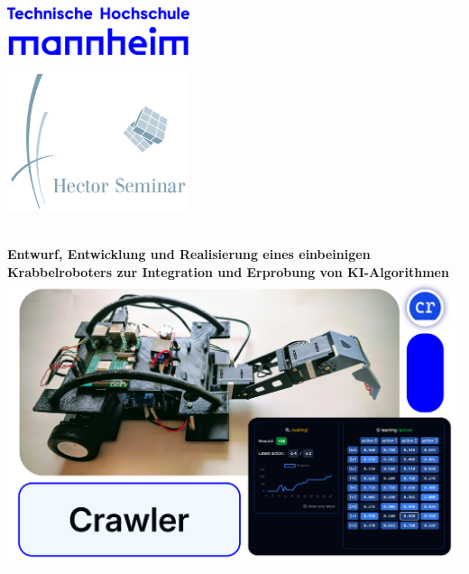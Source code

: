 \documentclass[12pt,a4paper]{article}
\begin{document}
	
	\begin{titlepage}
		\begin{minipage}[c]{0.49\textwidth}
			\raggedright
			\includegraphics[width=0.4\textwidth]{TH_Mannheim_Logo_RGB_blau.png}
		\end{minipage}
		\hfill
		\begin{minipage}[c]{0.49\textwidth}
			\raggedleft
			\includegraphics[width=0.4\textwidth]{logo.png}
		\end{minipage}
		\\[1cm]
		\centering
		\textbf{\LARGE{Entwurf, Entwicklung und Realisierung eines einbeinigen Krabbelroboters zur Integration und Erprobung von KI-Algorithmen}} \\[2cm]

		\includegraphics[width=\textwidth]{photos/crawler_deckblatt.png}
		

\end{titlepage}
\end{document}
